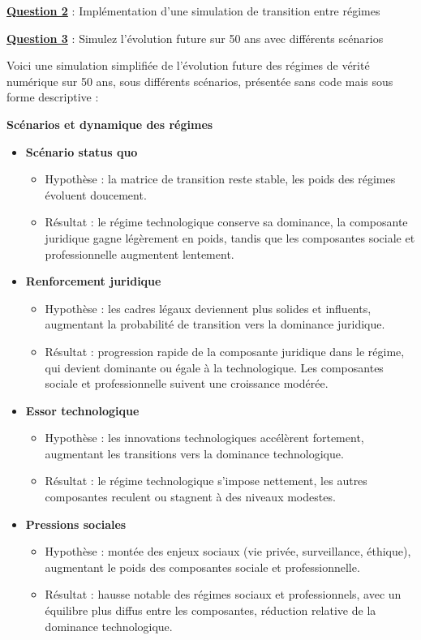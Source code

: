 \documentclass[12pt, a4paper]{article}
\newcommand{\question}[1]{\textbf{\underline{Question #1}}}
\begin{document}
\begin{enumerate}[label=\textbf{\arabic*.}, start=3]
		\question{2} : Implémentation d'une simulation de transition entre régimes
		
		\question{3} : Simulez l'évolution future sur 50 ans avec différents scénarios
		
		Voici une simulation simplifiée de l'évolution future des régimes de vérité numérique sur 50 ans, sous différents scénarios, présentée sans code mais sous forme descriptive :
		
		\textbf{Scénarios et dynamique des régimes}
		
		\begin{itemize}
			\item \textbf{Scénario status quo}
			\begin{itemize}
				\item Hypothèse : la matrice de transition reste stable, les poids des régimes évoluent doucement.
				\item Résultat : le régime technologique conserve sa dominance, la composante juridique gagne légèrement en poids, tandis que les composantes sociale et professionnelle augmentent lentement.
			\end{itemize}
			
			\item \textbf{Renforcement juridique}
			\begin{itemize}
				\item Hypothèse : les cadres légaux deviennent plus solides et influents, augmentant la probabilité de transition vers la dominance juridique.
				\item Résultat : progression rapide de la composante juridique dans le régime, qui devient dominante ou égale à la technologique. Les composantes sociale et professionnelle suivent une croissance modérée.
			\end{itemize}
			
			\item \textbf{Essor technologique}
			\begin{itemize}
				\item Hypothèse : les innovations technologiques accélèrent fortement, augmentant les transitions vers la dominance technologique.
				\item Résultat : le régime technologique s'impose nettement, les autres composantes reculent ou stagnent à des niveaux modestes.
			\end{itemize}
			
			\item \textbf{Pressions sociales}
			\begin{itemize}
				\item Hypothèse : montée des enjeux sociaux (vie privée, surveillance, éthique), augmentant le poids des composantes sociale et professionnelle.
				\item Résultat : hausse notable des régimes sociaux et professionnels, avec un équilibre plus diffus entre les composantes, réduction relative de la dominance technologique.
			\end{itemize}
		\end{itemize}
		

\end{enumerate}
\end{document}
